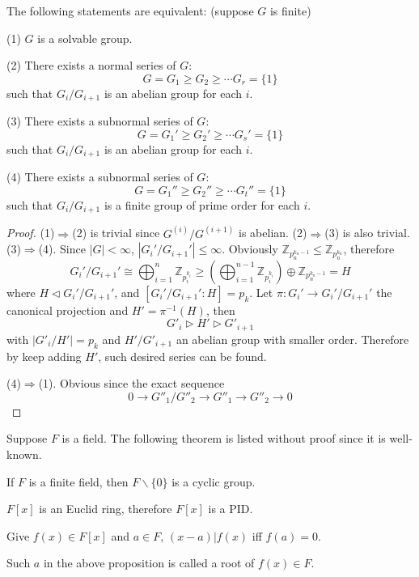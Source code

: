 \begin{proposition}
    The following statements are equivalent: (suppose $G$ is finite)
    \par (1) $G$ is a solvable group.
    \par (2) There exists a normal series of $G$:
    $$
    G=G_1\ge G_2\ge\cdots G_r=\{1\}
    $$
    such that $G_i/G_{i+1}$ is an abelian group for each $i$.
    \par (3) There exists a subnormal series of $G$:
    $$
    G=G_1'\ge G_2'\ge\cdots G_s'=\{1\}
    $$
    such that $G_i/G_{i+1}$ is an abelian group for each $i$.
    \par (4) There exists a subnormal series of $G$:
    $$
    G=G_1''\ge G_2''\ge\cdots G_t''=\{1\}
    $$
    such that $G_i/G_{i+1}$ is a finite group of prime order for each $i$.
\end{proposition}
\begin{proof}
    (1)$\Rightarrow$(2) is trivial since $G^{(i)}/G^{(i+1)}$ is abelian. (2)$\Rightarrow$(3) is also trivial. (3)$\Rightarrow$(4). Since $|G|<\infty$, $|G_i'/G_{i+1}'|\le\infty$. Obviously $\mathbb{Z}_{p_n^{k_n-1}}\le\mathbb{Z}_{p_n^{k_n}}$, therefore
    $$
    G_i'/G_{i+1}'\cong\bigoplus^{n}_{i=1}\mathbb{Z}_{p_i^{k_i}}\ge\left(\bigoplus^{n-1}_{i=1}\mathbb{Z}_{p_i^{k_i}}\right)\oplus\mathbb{Z}_{p_n^{k_n-1}}=H
    $$
    where $H\triangleleft G_i'/G_{i+1}'$, and $[G_i'/G_{i+1}':H]=p_k$. Let $\pi:G_i'\to G_i'/G_{i+1}'$ the canonical projection and $H'=\pi^{-1}(H)$, then
    $$
    G'_i\triangleright H'\triangleright G'_{i+1}
    $$
    with $|G'_i/H'|=p_k$ and $H'/G'_{i+1}$ an abelian group with smaller order. Therefore by keep adding $H'$, such desired series can be found.
    \par (4)$\Rightarrow$(1). Obvious since the exact sequence 
    $$0\to G''_{1}/G''_{2}\to G''_{1}\to G''_{2}\to 0$$
\end{proof}
\begin{remark}
    Suppose $F$ is a field. The following theorem is listed without proof since it is well-known.
\end{remark}
\begin{proposition}
    If $F$ is a finite field, then $F\backslash\{0\}$ is a cyclic group.
\end{proposition}
\begin{theorem}
        $F[x]$ is an Euclid ring, therefore $F[x]$ is a PID.
\end{theorem}
\begin{proposition}
    Give $f(x)\in F[x]$ and $a\in F$, $(x-a)|f(x)$ iff $f(a)=0$.
\end{proposition}
\begin{remark}
    Such $a$ in the above proposition is called a root of $f(x)\in F$.
\end{remark}